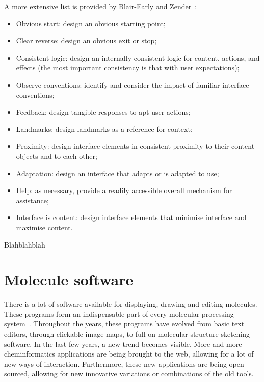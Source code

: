 A more extensive list is provided by Blair-Early and Zender~\cite{blair2008user}:
\begin{itemize}[noitemsep,topsep=0pt,parsep=0pt,partopsep=0pt]
\item Obvious start: design an obvious starting point;
\item Clear reverse: design an obvious exit or stop;
\item Consistent logic: design an internally consistent logic for content, actions, and effects (the most important consistency is that with user expectations);
\item Observe conventions: identify and consider the impact of familiar interface conventions;
\item Feedback: design tangible responses to apt user actions;
\item Landmarks: design landmarks as a reference for context;
\item Proximity: design interface elements in consistent proximity to their content objects and to each other;
\item Adaptation: design an interface that adapts or is adapted to use;
\item Help: as necessary, provide a readily accessible overall mechanism for assistance;
\item Interface is content: design interface elements that minimise interface and maximise content.
\end{itemize}


Blahblahblah~\cite{brehmer2013multi}
~\cite{payne2000varying}
~\cite{norman1990problem}
~\cite{sweller1994cognitive}
~\cite{gallopoulos1994computer}
~\cite{marcus1987taking}
~\cite{horvitz1999principles}
~\cite{jonassen2000toward}


\section{Molecule software}

There is a lot of software available for displaying, drawing and editing molecules. These programs form an indispensable part of every molecular processing system~\cite{ertl2010molecular}. Throughout the years, these programs have evolved from basic text editors, through clickable image maps, to full-on molecular structure sketching software. In the last few years, a new trend becomes visible. More and more cheminformatics applications are being brought to the web, allowing for a lot of new ways of interaction. Furthermore, these new applications are being open sourced, allowing for new innovative variations or combinations of the old tools.

